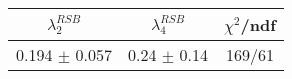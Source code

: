 \begin{tabular}{c|c||c}
$\lambda_{2}^{RSB}$ & $\lambda_4^{RSB}$ & $\chi^{2}$/ndf \\
\hline
0.194 $\pm$ 0.057 & 0.24 $\pm$ 0.14 & 169/61\\
\end{tabular}
